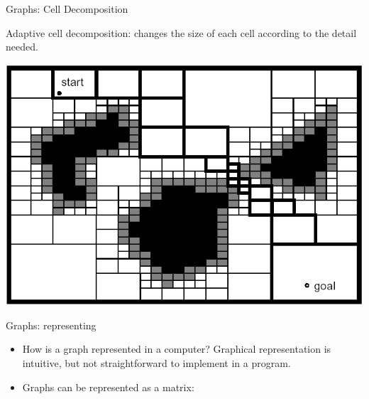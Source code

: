 \documentclass[compress]{beamer}
\begin{document}
\begin{frame}{Graphs: Cell Decomposition}

Adaptive cell decomposition: changes the size of each cell according
  to the detail needed.

    \begin{center}
        \includegraphics[width=0.8\linewidth]{adaptivecelldecomposition}
    \end{center}
\end{frame}

\begin{frame}{Graphs: representing}

\begin{itemize}
\item How is a graph represented in a computer? Graphical representation is
  intuitive, but not straightforward to implement in a program.
\item Graphs can be represented as a matrix:
\end{itemize}



\end{frame}
\end{document}
